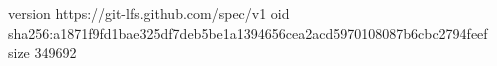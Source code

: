 version https://git-lfs.github.com/spec/v1
oid sha256:a1871f9fd1bae325df7deb5be1a1394656cea2acd5970108087b6cbc2794feef
size 349692
